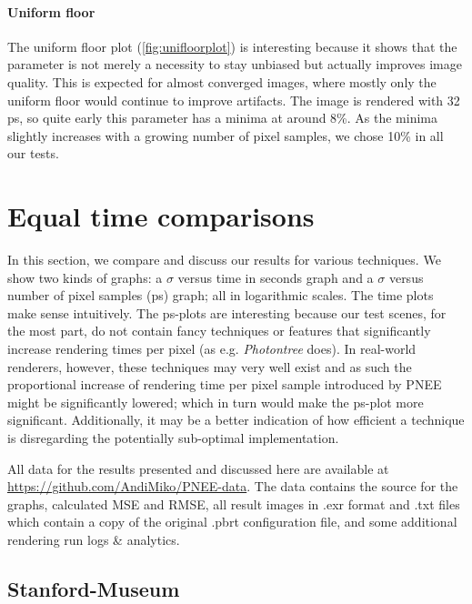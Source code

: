 \paragraph{Uniform floor}
\label{ch:ev:uniformfloor}
The uniform floor plot (\ref{fig:unifloorplot}) is interesting because it shows that the parameter is not merely a necessity to stay unbiased but actually improves image quality. This is expected for almost converged images, where mostly only the uniform floor would continue to improve artifacts. The image is rendered with 32 ps, so quite early this parameter has a minima at around 8\%. As the minima slightly increases with a growing number of pixel samples, we chose 10\% in all our tests.




\section{Equal time comparisons}
\label{sec:etc}
In this section, we compare and discuss our results for various techniques. We show two kinds of graphs: a $\sigma$ versus time in seconds graph and a $\sigma$ versus number of pixel samples (ps) graph; all in logarithmic scales. The time plots make sense intuitively. The ps-plots are interesting because our test scenes, for the most part, do not contain fancy techniques or features that significantly increase rendering times per pixel (as e.g. \textit{Photontree} does). In real-world renderers, however, these techniques may very well exist and as such the proportional increase of rendering time per pixel sample introduced by PNEE might be significantly lowered; which in turn would make the ps-plot more significant. Additionally, it may be a better indication of how efficient a technique is disregarding the potentially sub-optimal implementation.

All data for the results presented and discussed here are available at \url{https://github.com/AndiMiko/PNEE-data}. The data contains the source for the graphs, calculated MSE and RMSE, all result images in .exr format and .txt files which contain a copy of the original .pbrt configuration file, and some additional rendering run logs \& analytics.

\subsection{Stanford-Museum}
\label{sec:sm_eval}

\label{ch:ev:photontree}
\label{ch:ev:cdftree}

